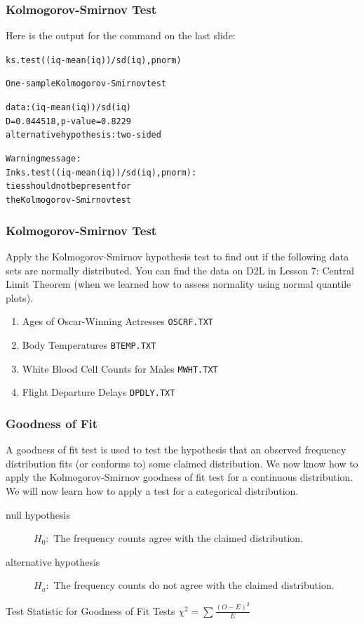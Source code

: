 \documentclass[xcolor=dvipsnames]{beamer}
\begin{document}
\begin{frame}[fragile]
  \frametitle{Kolmogorov-Smirnov Test}
  Here is the output for the command on the last slide:
\begin{alltt}
ks.test((iq-mean(iq))/sd(iq),pnorm)  

	One-sample Kolmogorov-Smirnov test  

data:  (iq - mean(iq))/sd(iq) 
D = 0.044518, p-value = 0.8229 
alternative hypothesis: two-sided  

Warning message: 
In ks.test((iq - mean(iq))/sd(iq), pnorm) : 
  ties should not be present for 
  the Kolmogorov-Smirnov test
\end{alltt}
\end{frame}

\begin{frame}
  \frametitle{Kolmogorov-Smirnov Test}
  {\ubung} Apply the Kolmogorov-Smirnov hypothesis test to find out if
  the following data sets are normally distributed. You can find the
  data on D2L in Lesson 7: Central Limit Theorem (when we learned how
  to assess normality using normal quantile plots).
  \begin{enumerate}
  \item Ages of Oscar-Winning Actresses \texttt{OSCRF.TXT}
  \item Body Temperatures \texttt{BTEMP.TXT}
  \item White Blood Cell Counts for Males \texttt{MWHT.TXT}
  \item Flight Departure Delays \texttt{DPDLY.TXT}
  \end{enumerate}
\end{frame}

\begin{frame}
  \frametitle{Goodness of Fit}
  A \alert{goodness of fit} test is used to test the hypothesis
  that an observed frequency distribution fits (or conforms to)
  some claimed distribution. We now know how to apply the
  Kolmogorov-Smirnov goodness of fit test for a continuous
  distribution. We will now learn how to apply a test for a
  categorical distribution. 

  \begin{description}
  \item[null hypothesis] $H_{0}:$ The frequency counts agree with the claimed
    distribution.
  \item[alternative hypothesis] $H_{a}:$ The frequency counts do not agree with the claimed
    distribution.
  \end{description}

  \bigskip

  \begin{block}{Test Statistic for Goodness of Fit Tests}
    $\displaystyle \chi^{2}=\sum\frac{(O-E)^{2}}{E}$
  \end{block}
\end{frame}
\end{document}
